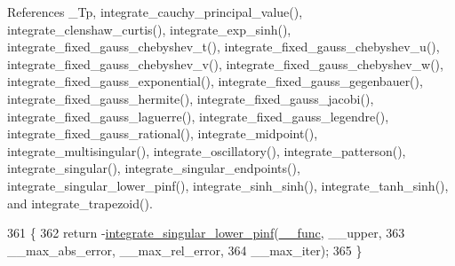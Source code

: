References \+\_\+\+Tp, integrate\+\_\+cauchy\+\_\+principal\+\_\+value(), integrate\+\_\+clenshaw\+\_\+curtis(), integrate\+\_\+exp\+\_\+sinh(), integrate\+\_\+fixed\+\_\+gauss\+\_\+chebyshev\+\_\+t(), integrate\+\_\+fixed\+\_\+gauss\+\_\+chebyshev\+\_\+u(), integrate\+\_\+fixed\+\_\+gauss\+\_\+chebyshev\+\_\+v(), integrate\+\_\+fixed\+\_\+gauss\+\_\+chebyshev\+\_\+w(), integrate\+\_\+fixed\+\_\+gauss\+\_\+exponential(), integrate\+\_\+fixed\+\_\+gauss\+\_\+gegenbauer(), integrate\+\_\+fixed\+\_\+gauss\+\_\+hermite(), integrate\+\_\+fixed\+\_\+gauss\+\_\+jacobi(), integrate\+\_\+fixed\+\_\+gauss\+\_\+laguerre(), integrate\+\_\+fixed\+\_\+gauss\+\_\+legendre(), integrate\+\_\+fixed\+\_\+gauss\+\_\+rational(), integrate\+\_\+midpoint(), integrate\+\_\+multisingular(), integrate\+\_\+oscillatory(), integrate\+\_\+patterson(), integrate\+\_\+singular(), integrate\+\_\+singular\+\_\+endpoints(), integrate\+\_\+singular\+\_\+lower\+\_\+pinf(), integrate\+\_\+sinh\+\_\+sinh(), integrate\+\_\+tanh\+\_\+sinh(), and integrate\+\_\+trapezoid().


\begin{DoxyCode}
361     \{
362       \textcolor{keywordflow}{return} -\hyperlink{namespace____gnu__cxx_aead3b14ccced37c14f64ecd358a2b0c8}{integrate\_singular\_lower\_pinf}(\hyperlink{namespace____gnu__cxx_af2b2f0c7a2ae72b922b1afefae5a65b2}{\_\_func}, \_\_upper,
363                                             \_\_max\_abs\_error, \_\_max\_rel\_error,
364                                             \_\_max\_iter);
365     \}
\end{DoxyCode}
\mbox{\label{namespace____gnu__cxx_ab28f15831507df5ef94f271648fb2263}} 
